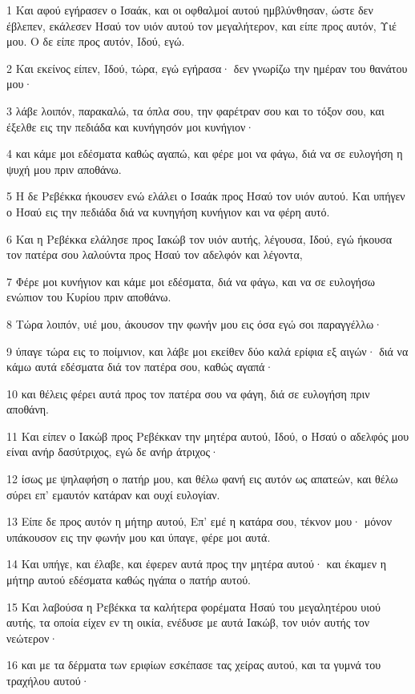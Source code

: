 \par 1 Και αφού εγήρασεν ο Ισαάκ, και οι οφθαλμοί αυτού ημβλύνθησαν, ώστε δεν έβλεπεν, εκάλεσεν Ησαύ τον υιόν αυτού τον μεγαλήτερον, και είπε προς αυτόν, Υιέ μου. Ο δε είπε προς αυτόν, Ιδού, εγώ.
\par 2 Και εκείνος είπεν, Ιδού, τώρα, εγώ εγήρασα· δεν γνωρίζω την ημέραν του θανάτου μου·
\par 3 λάβε λοιπόν, παρακαλώ, τα όπλα σου, την φαρέτραν σου και το τόξον σου, και έξελθε εις την πεδιάδα και κυνήγησόν μοι κυνήγιον·
\par 4 και κάμε μοι εδέσματα καθώς αγαπώ, και φέρε μοι να φάγω, διά να σε ευλογήση η ψυχή μου πριν αποθάνω.
\par 5 Η δε Ρεβέκκα ήκουσεν ενώ ελάλει ο Ισαάκ προς Ησαύ τον υιόν αυτού. Και υπήγεν ο Ησαύ εις την πεδιάδα διά να κυνηγήση κυνήγιον και να φέρη αυτό.
\par 6 Και η Ρεβέκκα ελάλησε προς Ιακώβ τον υιόν αυτής, λέγουσα, Ιδού, εγώ ήκουσα τον πατέρα σου λαλούντα προς Ησαύ τον αδελφόν και λέγοντα,
\par 7 Φέρε μοι κυνήγιον και κάμε μοι εδέσματα, διά να φάγω, και να σε ευλογήσω ενώπιον του Κυρίου πριν αποθάνω.
\par 8 Τώρα λοιπόν, υιέ μου, άκουσον την φωνήν μου εις όσα εγώ σοι παραγγέλλω·
\par 9 ύπαγε τώρα εις το ποίμνιον, και λάβε μοι εκείθεν δύο καλά ερίφια εξ αιγών· διά να κάμω αυτά εδέσματα διά τον πατέρα σου, καθώς αγαπά·
\par 10 και θέλεις φέρει αυτά προς τον πατέρα σου να φάγη, διά σε ευλογήση πριν αποθάνη.
\par 11 Και είπεν ο Ιακώβ προς Ρεβέκκαν την μητέρα αυτού, Ιδού, ο Ησαύ ο αδελφός μου είναι ανήρ δασύτριχος, εγώ δε ανήρ άτριχος·
\par 12 ίσως με ψηλαφήση ο πατήρ μου, και θέλω φανή εις αυτόν ως απατεών, και θέλω σύρει επ' εμαυτόν κατάραν και ουχί ευλογίαν.
\par 13 Είπε δε προς αυτόν η μήτηρ αυτού, Επ' εμέ η κατάρα σου, τέκνον μου· μόνον υπάκουσον εις την φωνήν μου και ύπαγε, φέρε μοι αυτά.
\par 14 Και υπήγε, και έλαβε, και έφερεν αυτά προς την μητέρα αυτού· και έκαμεν η μήτηρ αυτού εδέσματα καθώς ηγάπα ο πατήρ αυτού.
\par 15 Και λαβούσα η Ρεβέκκα τα καλήτερα φορέματα Ησαύ του μεγαλητέρου υιού αυτής, τα οποία είχεν εν τη οικία, ενέδυσε με αυτά Ιακώβ, τον υιόν αυτής τον νεώτερον·
\par 16 και με τα δέρματα των εριφίων εσκέπασε τας χείρας αυτού, και τα γυμνά του τραχήλου αυτού·
